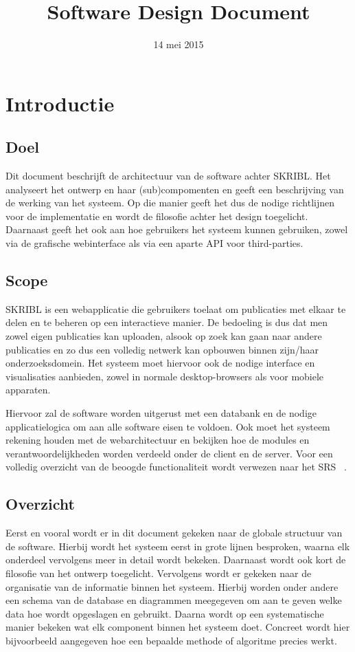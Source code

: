 \documentclass{article}
\title{Software Design Document}
\author{} %
\date{14 mei 2015} %
\begin{document}




\tableofcontents
\newpage

\section{Introductie}

\subsection{Doel}

Dit document beschrijft de architectuur van de software achter SKRIBL. 
Het analyseert het ontwerp en haar (sub)compomenten en geeft een beschrijving
van de werking van het systeem. Op die manier geeft het dus de nodige richtlijnen
voor de implementatie en wordt de filosofie achter het design toegelicht.
Daarnaast geeft het ook aan hoe gebruikers het systeem kunnen gebruiken, zowel
via de grafische webinterface als via een aparte API voor third-parties.

\subsection{Scope}

SKRIBL is een webapplicatie die gebruikers toelaat om publicaties met elkaar te delen
en te beheren op een interactieve manier. De bedoeling is dus dat men zowel eigen publicaties kan uploaden, alsook op zoek kan gaan naar andere publicaties en zo dus een volledig netwerk kan opbouwen binnen zijn/haar onderzoeksdomein. Het systeem moet hiervoor ook de nodige interface en visualisaties aanbieden, zowel in normale desktop-browsers als voor mobiele apparaten.

Hiervoor zal de software worden uitgerust met een databank en de nodige applicatielogica om aan alle software eisen te voldoen. Ook moet het systeem rekening houden met de webarchitectuur en bekijken hoe de modules en verantwoordelijkheden worden verdeeld onder de client en de server. Voor een volledig overzicht van de beoogde functionaliteit wordt verwezen naar het SRS ~\cite{Xtreport:SRS}.

\subsection{Overzicht}

Eerst en vooral wordt er in dit document gekeken naar de globale structuur van de software. Hierbij wordt het systeem eerst in grote lijnen besproken, waarna elk onderdeel vervolgens meer in detail wordt bekeken. Daarnaast wordt ook kort de filosofie van het ontwerp toegelicht. 
Vervolgens wordt er gekeken naar de organisatie van de informatie binnen het systeem. Hierbij worden onder andere een schema van de database en diagrammen meegegeven om aan te geven welke data hoe wordt opgeslagen en gebruikt. 
Daarna wordt op een systematische manier bekeken wat elk component binnen het systeem doet. Concreet wordt hier bijvoorbeeld aangegeven hoe een bepaalde methode of algoritme precies werkt.
\end{document}
